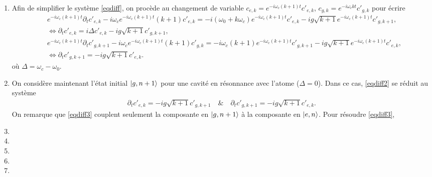 {\begin{enumerate}
    \item Afin de simplifier le système \eqref{eqdiff}, on procède au changement de variable $c_{e, k} =  e^{-i\omega_c (k+1) t} c'_{e, k}$, $c_{g, k} =  e^{-i\omega_c k t} c'_{g, k}$ pour écrire 
    \begin{align}
        &e^{-i\omega_c (k+1) t}\partial_t{c}'_{e, k} - i\omega_c e^{-i\omega_c (k+1) t} (k+1) {c}'_{e, k} = - i (\omega_0 + k \omega_c) e^{-i\omega_c (k+1) t} c'_{e, k} - ig \sqrt{k+1}e^{-i\omega_c (k+1) t} c'_{g, k+1},\nonumber\\
        &\iff \partial_t{c}'_{e, k}  = i\Delta c'_{e, k} - ig \sqrt{k+1} c'_{g, k+1}, \nonumber \\
        &e^{-i\omega_c (k+1) t} \partial_t{c}'_{g, k+1} - i\omega_c e^{-i\omega_c (k+1) t} (k+1)  c'_{g, k} = - i\omega_c (k+1) e^{-i\omega_c (k+1) t} c'_{g, k+1} - ig \sqrt{k+1} e^{-i\omega_c (k+1) t} c'_{e, k}, \nonumber\\
        &\iff \partial_t{c}'_{g, k+1}  = - ig \sqrt{k+1}  c'_{e, k}
        .\label{eqdiff2}
     \end{align} 
     où $\Delta = \omega_c - \omega_0$.
    \item On considère maintenant l'état initial $\ket{g, n+1}$ pour une cavité en résonnance avec l'atome ($\Delta = 0$). Dans ce cas, \eqref{eqdiff2} se réduit au système 
    \begin{align}
         \partial_t{c}'_{e, k}  = - ig \sqrt{k+1} c'_{g, k+1}\quad \& \quad \partial_t{c}'_{g, k+1}  = - ig \sqrt{k+1}  c'_{e, k}
        .\label{eqdiff3}
     \end{align} 
    On remarque que \eqref{eqdiff3} couplent seulement la composante en $\ket{g, n+1}$ à la composante en $\ket{e, n}$. Pour résoudre \eqref{eqdiff3}, 
    \item 
    \item 
    \item
    \item
    \item
\end{enumerate}
}